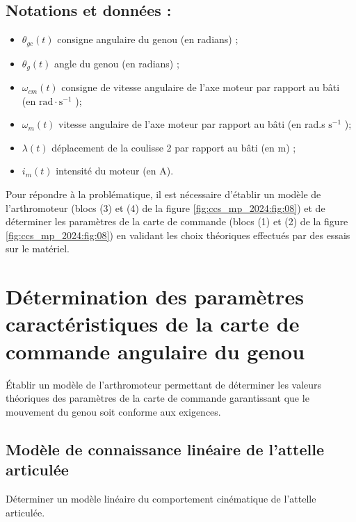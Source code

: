 \subsection*{Notations et données :}
\begin{itemize}
  \item $\theta_{g c}(t)$ consigne angulaire du genou (en radians) ;

  \item $\theta_{g}(t)$ angle du genou (en radians) ;

  \item $\omega_{c m}(t)$ consigne de vitesse angulaire de l'axe moteur par rapport au bâti (en $\mathrm{rad} \cdot \mathrm{s}^{-1}$ );

  \item $\omega_{m}(t)$ vitesse angulaire de l'axe moteur par rapport au bâti (en rad.s $\mathrm{s}^{-1}$ );

  \item $\lambda(t)$ déplacement de la coulisse 2 par rapport au bâti (en m) ;

  \item $i_{m}(t)$ intensité du moteur (en A).

\end{itemize}

Pour répondre à la problématique, il est nécessaire d'établir un modèle de l'arthromoteur (blocs (3) et (4) de la figure \ref{fig:ccs_mp_2024:fig:08}) et de déterminer les paramètres de la carte de commande (blocs (1) et (2) de la figure \ref{fig:ccs_mp_2024:fig:08}) en validant les choix théoriques effectués par des essais sur le matériel.

\section{Détermination des paramètres caractéristiques de la carte de commande angulaire du genou}
\begin{obj}
Établir un modèle de l'arthromoteur permettant de déterminer les valeurs théoriques des paramètres de la carte de commande garantissant que le mouvement du genou soit conforme aux exigences.
\end{obj}
\subsection{Modèle de connaissance linéaire de l'attelle articulée}

\begin{obj}
Déterminer un modèle linéaire du comportement cinématique de l'attelle articulée.
\end{obj}

